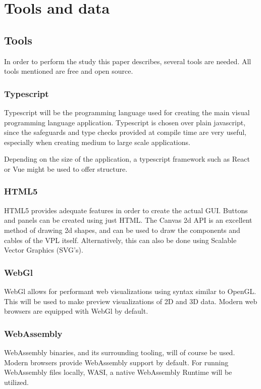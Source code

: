 \newpage
\section{Tools and data}

\subsection*{Tools}
In order to perform the study this paper describes, several tools are needed. All tools mentioned are free and open source.

\subsubsection*{Typescript}
Typescript will be the programming language used for creating the main visual programming language application. Typescript is chosen over plain javascript, since the safeguards and type checks provided at compile time are very useful, especially when creating medium to large scale applications. 

Depending on the size of the application, a typescript framework such as React or Vue might be used to offer structure.

\subsubsection*{HTML5}
HTML5 provides adequate features in order to create the actual GUI. Buttons and panels can be created using just HTML. The Canvas 2d API is an excellent method of drawing 2d shapes, and can be used to draw the components and cables of the VPL itself. Alternatively, this can also be done using Scalable Vector Graphics (SVG's). 

\subsubsection*{WebGl}
WebGl allows for performant web visualizations using syntax similar to OpenGL. This will be used to make preview visualizations of 2D and 3D data. Modern web browsers are equipped with WebGl by default. 

\subsubsection*{WebAssembly}
WebAssembly binaries, and its surrounding tooling, will of course be used. Modern browsers provide WebAssembly support by default. For running WebAssembly files locally, WASI, a native WebAssembly Runtime will be utilized. 

